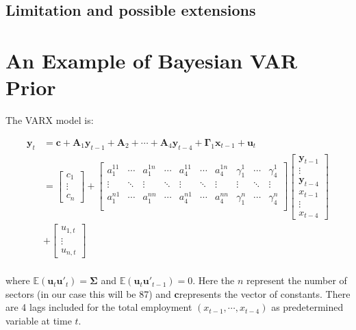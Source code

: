 \documentclass{monashthesis}
\begin{document}
\hypertarget{limitation-and-possible-extensions}{%
\section{Limitation and possible extensions}\label{limitation-and-possible-extensions}}

\appendix

\hypertarget{an-example-of-bayesian-var-prior}{%
\chapter{An Example of Bayesian VAR Prior}\label{an-example-of-bayesian-var-prior}}

The VARX model is:

\begin{align}
\boldsymbol{y}_t&=\boldsymbol{c}+\boldsymbol{A}_1 \boldsymbol{y}_{t-1}+\boldsymbol{A}_2+\cdots+\boldsymbol{A}_4\boldsymbol{y}_{t-4}+\boldsymbol{\Gamma}_1\boldsymbol{x}_{t-1}+\boldsymbol{u}_t\\
&=
\begin{bmatrix}
c_1\\
\vdots\\
c_n
\end{bmatrix}
+
\begin{bmatrix}
a_1^{11}&\cdots&a_1^{1n}&\cdots&a_4^{11}&\cdots&a_4^{1n}&\gamma_1^{1}&\cdots&\gamma_4^{1}\\
\vdots&\ddots&\vdots&\ddots&\vdots&\ddots&\vdots&\vdots&\ddots&\vdots\\
a_1^{n1}&\cdots&a_1^{nn}&\cdots&a_4^{n1}&\cdots&a_4^{nn}&\gamma_1^n&\cdots&\gamma_4^n\\
\end{bmatrix}
\begin{bmatrix}
\boldsymbol{y}_{t-1}\\
\vdots\\
\boldsymbol{y}_{t-4}\\
x_{t-1}\\
\vdots\\
x_{t-4}
\end{bmatrix}\\
&+
\begin{bmatrix}
u_{1,t}\\
\vdots\\
u_{n,t}
\end{bmatrix}\\
\end{align}

where \(\mathbb{E}(\boldsymbol{u}_t\boldsymbol{u}'_t)=\boldsymbol{\Sigma}\) and \(\mathbb{E}(\boldsymbol{u}_t\boldsymbol{u'}_{t-1})=0\). Here the \(n\) represent the number of sectors (in our case this will be 87) and \(\boldsymbol{c}\)represents the vector of constants. There are 4 lags included for the total employment \((x_{t-1},\cdots,x_{t-4})\) as predetermined variable at time \(t\).
\end{document}
